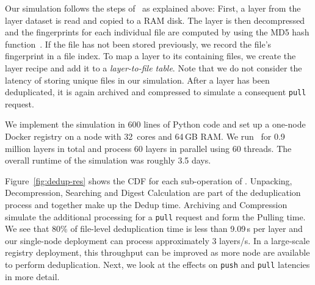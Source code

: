 Our simulation follows the steps of \sysname\ as explained above:
First, a layer from the layer dataset is read and copied to a RAM disk. 
%
%
The layer is then decompressed and the fingerprints for each individual file
are computed by using the MD5 hash function~\cite{MD5}.
%
%
%
If the file has not been stored previously, we record the
file's fingerprint in a file index.
%
%
%
To map a layer to its containing files, we create the layer recipe and add it
to a \emph{layer-to-file table}.
%
%
%
Note that we do not consider the latency of storing unique files in our simulation.
%
After a layer has been deduplicated, it is again archived and compressed to
simulate a consequent \texttt{pull} request.
%
%

We implement the simulation in 600 lines of Python code
and set up a one-node Docker registry on a node with 32~cores and 64\,GB RAM.
%
We run \sysname\ for 0.9 million layers in total and process 60 layers in
parallel using 60 threads.
%
The overall runtime of the simulation was roughly 3.5 days.
%

Figure~\ref{fig:dedup-res} shows the CDF for each sub-operation of
\sysname.
%
Unpacking, Decompression, Searching and Digest Calculation are part of
the deduplication process and together make up the Dedup time.
%
Archiving and Compression simulate the additional processing for a \texttt{pull}
request and form the Pulling time.
%
We see that 80\% of file-level deduplication time is less than 9.09\,s per layer
and our single-node deployment can process approximately 3 layers/s.
%
In a large-scale registry deployment, this throughput can be improved
as more node are available to perform deduplication.
%
%
Next, we look at the effects on \texttt{push} and \texttt{pull}
latencies in more detail.

